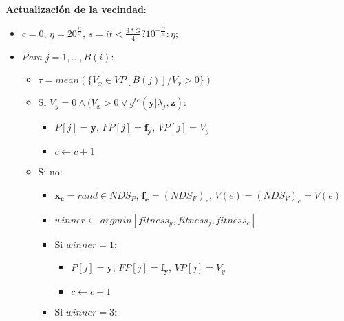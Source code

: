 \begin{center}
\begin{minipage}[H]{0.8\linewidth}
\begin{algorithm}[H]
 \vspace{0.3cm}
  
 \textbf{Actualización de la vecindad}:\\
        \begin{itemize}
        	\vspace{0.15cm} \item $c=0$,  $\eta= 20^{\frac{it}{G}}$, $s= it < \frac{3*G}{4} ? 10^{-\frac{G}{it}} : \eta $;
        	\vspace{0.15cm}\item \textit{Para $j=1, \dots, B(i)$}:
        	\begin{itemize}
        		\vspace{0.15cm}\item $\tau= mean (\{V_x \in VP[B(j)] / V_x > 0\})$
            	\vspace{0.15cm}\item Si $V_y = 0 \wedge (V_x > 0 \vee g^{te}(\boldsymbol{y}| \lambda_j, \boldsymbol{z})$: 
            	\begin{itemize}
            		\vspace{0.15cm}\item $P[j]=\boldsymbol{y}$, $FP[j]=\boldsymbol{f_y}$, $VP[j]=V_y$
            		\vspace{0.15cm}\item $c \gets c + 1$
				\end{itemize}            	 
            	\vspace{0.15cm}\item Si no:
            	\begin{itemize}
        		\vspace{0.15cm}\item $\boldsymbol{x_e}=rand \in NDS_P$, $\boldsymbol{f_e}=(NDS_F)_{e}$, $V(e) = (NDS_V)_{e}=V(e)$
            	\vspace{0.15cm}\item $winner \gets argmin [fitness_y, fitness_j, fitness_e]$
            	\vspace{0.15cm}\item Si $winner = 1$: 
            	\begin{itemize}
            		\vspace{0.15cm}\item $P[j]=\boldsymbol{y}$, $FP[j]=\boldsymbol{f_y}$, $VP[j]=V_y$
            		\vspace{0.15cm}\item $c \gets c + 1$
				\end{itemize} 
				\vspace{0.15cm}\item Si $winner = 3$: 

\end{itemize}
\end{itemize}
\end{itemize}
\end{algorithm}
\end{minipage}
\end{center}

